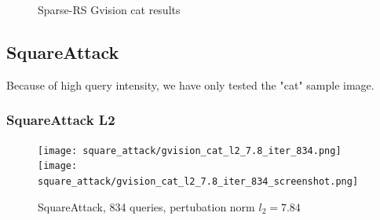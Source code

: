 \begin{figure}
\centering
 \hfill

\caption{Sparse-RS Gvision cat results}
\label{fig:sparse_rs_cat}
\end{figure}


\subsection{SquareAttack}
\label{square_poc}
Because of high query intensity, we have only tested the "cat" sample image.
\cite{Andriushchenko2020SquareAA}

\subsubsection{SquareAttack L2}
\begin{figure}[!htb]
\null\hspace{1cm}
  \texttt{[image: square\_attack/gvision\_cat\_l2\_7.8\_iter\_834.png]}
\endminipage
\null\hspace{1cm}
  \texttt{[image: square\_attack/gvision\_cat\_l2\_7.8\_iter\_834\_screenshot.png]}
\endminipage
\caption{SquareAttack, 834 queries, pertubation norm $l_2 = 7.84$ }
\label{fig:square_cat_l2}
\end{figure}

